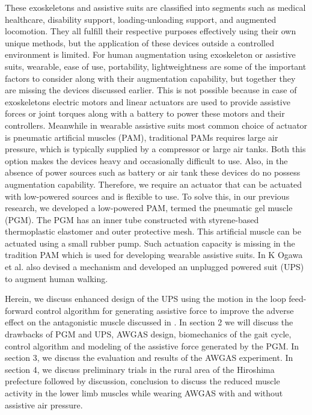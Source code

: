 \documentclass[paper,JRM,paper]{jaciiiarticle}
\begin{document}
These exoskeletons and assistive suits are classified into segments such as medical healthcare, disability support, loading-unloading support, and augmented locomotion. They all fulfill their respective purposes effectively using their own unique methods, but the application of these devices outside a controlled environment is limited. For human augmentation using exoskeleton or assistive suits, wearable, ease of use, portability, lightweightness are some of the important factors to consider along with their augmentation capability, but together they are missing the devices discussed earlier. This is not possible because in case of exoskeletons electric motors and linear actuators are used to provide assistive forces or joint torques along with a battery to power these motors and their controllers. Meanwhile in wearable assistive suits most common choice of actuator is pneumatic artificial muscles (PAM)\cite{10}, traditional PAMs requires large air pressure, which is typically supplied by a compressor or large air tanks. Both this option makes the devices heavy and occasionally difficult to use. Also, in the absence of power sources such as battery or air tank these devices do no possess augmentation capability. Therefore, we require an actuator that can be actuated with low-powered sources and is flexible to use. To solve this, in our previous research\cite{11}, we developed a low-powered PAM, termed the pneumatic gel muscle (PGM). The PGM has an inner tube constructed with styrene-based thermoplastic elastomer and outer protective mesh. This artificial muscle can be actuated using a small rubber pump. Such actuation capacity is missing in the tradition PAM which is used for developing wearable assistive suits. In \cite{11} K Ogawa et al. also devised a mechanism and developed an unplugged powered suit (UPS) to augment human walking. 

Herein, we discuss enhanced design of the UPS using the motion in the loop feed-forward control algorithm for generating assistive force to improve the adverse effect on the antagonistic muscle discussed in \cite{11}. In section 2 we will discuss the drawbacks of PGM and UPS, AWGAS design, biomechanics of the gait cycle, control algorithm and modeling of the assistive force generated by the PGM. In section 3, we discuss the evaluation and results of the AWGAS experiment. In section 4, we discuss preliminary trials in the rural area of the Hiroshima prefecture followed by discussion, conclusion to discuss the reduced muscle activity in the lower limb muscles while wearing AWGAS with and without assistive air pressure.
\end{document}
